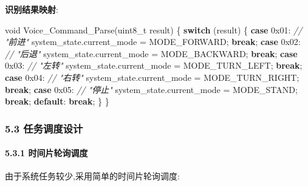 \documentclass[
]{article}
\newenvironment{Shaded}{}{}
\newcommand{\BaseNTok}[1]{\textcolor[rgb]{0.25,0.63,0.44}{#1}}
\newcommand{\CommentTok}[1]{\textcolor[rgb]{0.38,0.63,0.69}{\textit{#1}}}
\newcommand{\ControlFlowTok}[1]{\textcolor[rgb]{0.00,0.44,0.13}{\textbf{#1}}}
\newcommand{\DataTypeTok}[1]{\textcolor[rgb]{0.56,0.13,0.00}{#1}}
\newcommand{\NormalTok}[1]{#1}
\begin{document}
\textbf{识别结果映射}:

\begin{Shaded}
\begin{Highlighting}[]
\DataTypeTok{void}\NormalTok{ Voice\_Command\_Parse(}\DataTypeTok{uint8\_t}\NormalTok{ result)}
\NormalTok{\{}
    \ControlFlowTok{switch}\NormalTok{ (result) \{}
        \ControlFlowTok{case} \BaseNTok{0x01}\NormalTok{:  }\CommentTok{// "前进"}
\NormalTok{            system\_state.current\_mode = MODE\_FORWARD;}
            \ControlFlowTok{break}\NormalTok{;}
        \ControlFlowTok{case} \BaseNTok{0x02}\NormalTok{:  }\CommentTok{// "后退"}
\NormalTok{            system\_state.current\_mode = MODE\_BACKWARD;}
            \ControlFlowTok{break}\NormalTok{;}
        \ControlFlowTok{case} \BaseNTok{0x03}\NormalTok{:  }\CommentTok{// "左转"}
\NormalTok{            system\_state.current\_mode = MODE\_TURN\_LEFT;}
            \ControlFlowTok{break}\NormalTok{;}
        \ControlFlowTok{case} \BaseNTok{0x04}\NormalTok{:  }\CommentTok{// "右转"}
\NormalTok{            system\_state.current\_mode = MODE\_TURN\_RIGHT;}
            \ControlFlowTok{break}\NormalTok{;}
        \ControlFlowTok{case} \BaseNTok{0x05}\NormalTok{:  }\CommentTok{// "停止"}
\NormalTok{            system\_state.current\_mode = MODE\_STAND;}
            \ControlFlowTok{break}\NormalTok{;}
        \ControlFlowTok{default}\NormalTok{:}
            \ControlFlowTok{break}\NormalTok{;}
\NormalTok{    \}}
\NormalTok{\}}
\end{Highlighting}
\end{Shaded}

\hypertarget{ux4efbux52a1ux8c03ux5ea6ux8bbeux8ba1}{%
\subsubsection{5.3
任务调度设计}\label{ux4efbux52a1ux8c03ux5ea6ux8bbeux8ba1}}

\hypertarget{ux65f6ux95f4ux7247ux8f6eux8be2ux8c03ux5ea6}{%
\paragraph{5.3.1
时间片轮询调度}\label{ux65f6ux95f4ux7247ux8f6eux8be2ux8c03ux5ea6}}

由于系统任务较少,采用简单的时间片轮询调度:
\end{document}
